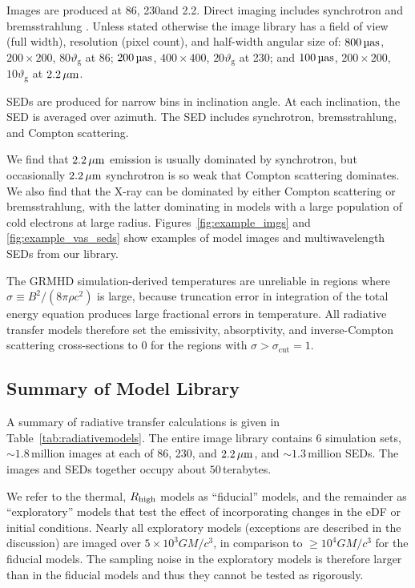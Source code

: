 Images are produced at 86\GHz, 230\GHz and 2.2\um.
Direct imaging includes synchrotron and bremsstrahlung \citep[both ion-electron and electron-electron; see][for a recent review]{2020ApJ...898...50Y}.
Unless stated otherwise the image library has a field of view (full width), resolution (pixel count), and half-width angular size of: $800\uas$, $200 \times 200$, $80 \vartheta_\mathrm{g}$ at 86\GHz; $200\uas$, $400 \times 400$, $20 \vartheta_\mathrm{g}$ at 230\GHz; and $100\uas$, $200\times 200$, $10 \vartheta_\mathrm{g}$ at $2.2\,\mu\mathrm{m}$.

SEDs are produced for narrow bins in inclination angle.
At each inclination, the SED is averaged over azimuth.
The SED includes synchrotron, bremsstrahlung, and Compton scattering.

We find that $2.2\,\mu\mathrm{m}$ emission is usually dominated by synchrotron, but occasionally $2.2\,\mu\mathrm{m}$ synchrotron is so weak that Compton scattering dominates.
We also find that the X-ray can be dominated by either Compton scattering or bremsstrahlung, with the latter dominating in models with a large population of cold electrons at large radius.
Figures~\ref{fig:example_imgs} and \ref{fig:example_vas_seds} show examples of model images and multiwavelength SEDs from our library.

The GRMHD simulation-derived temperatures are unreliable in regions where $\sigma \equiv B^2/(8\pi\rho c^2)$ is large, because truncation error in integration of the total energy equation produces large fractional errors in temperature.
All radiative transfer models therefore set the emissivity, absorptivity, and inverse-Compton scattering cross-sections to $0$ for the regions with $\sigma > \sigma_\mathrm{cut} = 1$.

\subsection{Summary of \texorpdfstring{\sgra}{Sgr A*} Model Library}

A summary of radiative transfer calculations is given in Table~\ref{tab:radiativemodels}.
The entire image library contains $6$ simulation sets,  $\sim 1.8$\,million images at each of 86\GHz, 230\GHz, and $2.2\,\mu\mathrm{m}$, and $\sim 1.3$\,million SEDs.
The images and SEDs together occupy about $50$\,terabytes.

We refer to the thermal, $R_\mathrm{high}$ models as ``fiducial'' models, and the remainder as ``exploratory'' models that test the effect of incorporating changes in the eDF or initial conditions.
Nearly all exploratory models (exceptions are described in the discussion) are imaged over $5 \times 10^3 G M/c^3$, in comparison to $\ge 10^4 G M/c^3$ for the fiducial models.
The sampling noise in the exploratory models is therefore larger than in the fiducial models and thus they cannot be tested as rigorously.

